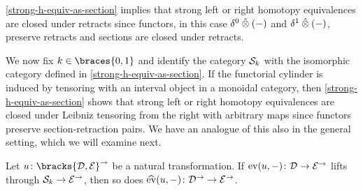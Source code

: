 \documentclass[reqno,10pt,a4paper,oneside,draft]{amsart}
\begin{document}
\begin{remark}
\cref{strong-h-equiv-as-section} implies that strong left or right homotopy equivalences are closed under retracts since functors, in this case $\delta^0 \hatotimes (-)$ and $\delta^1 \hatotimes (-)$, preserve retracts and sections are closed under retracts.
\end{remark}

We now fix $k \in \braces{0, 1}$ and identify the category $\cal{S}_k$ with the isomorphic category defined in \cref{strong-h-equiv-as-section}.
If the functorial cylinder is induced by tensoring with an interval object in a monoidal category, then \cref{strong-h-equiv-as-section} shows that strong left or right homotopy equivalences are closed under Leibniz tensoring from the right with arbitrary maps since functors preserve section-retraction pairs.
We have an analogue of this also in the general setting, which we will examine next.

\begin{lemma} \label{leibniz-lift}
Let $u \co \bracks{\cal{D}, \cal{E}}^\to$ be a natural transformation.
If $\eval(u, -) \co \cal{D} \to \cal{E}^\to$ lifts through $\cal{S}_k \to \catE^\to$, then so does $\hateval(u, -) \co \cal{D}^\to \to \catE^\to$.
\end{lemma}
\end{document}

